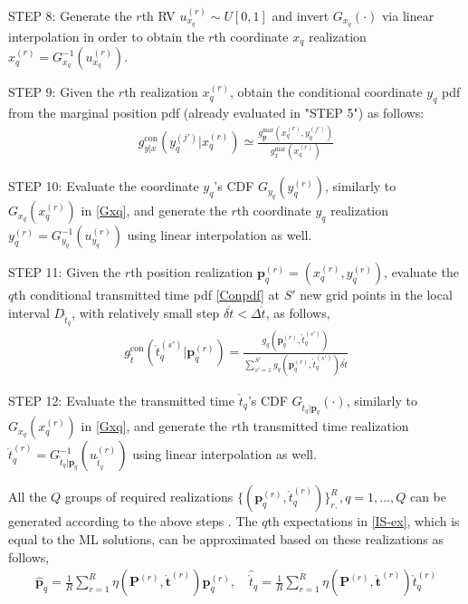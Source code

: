\documentclass[review]{elsarticle}
\begin{document}
STEP 8: Generate the $r$th RV $u_{x_q}^{(r)}\sim U[0,1]$ and invert $G_{x_q}(\cdot)$ via linear interpolation in order to obtain the $r$th coordinate $x_q$ realization $x_q^{(r)}=G_{x_q}^{-1}(u_{x_q}^{(r)})$.

STEP 9: Given the $r$th realization $x_q^{(r)}$, obtain the conditional coordinate $y_q$ pdf from the marginal position pdf (already evaluated in "STEP 5") as follows:
\begin{align}\label{step9}
    g_{y\vert x}^{\text{con}}(y_q^{(j')}\vert x_q^{(r)})\simeq \frac{g_{\boldsymbol{p}}^{\text{mar}}(x_q^{(r)},y_q^{(j')})}{g_{x}^{\text{mar}}(x_q^{(r)})}
\end{align}

STEP 10: Evaluate the coordinate $y_q$'s CDF $G_{y_q}(y_q^{(r)})$, similarly to $G_{x_q}(x_q^{(r)})$ in \eqref{Gxq}, and generate the $r$th coordinate $y_q$ realization $y_q^{(r)}=G_{y_q}^{-1}(u_{y_q}^{(r)})$ using linear interpolation as well.

STEP 11: Given the $r$th position realization $\boldsymbol{p}_q^{(r)}=(x_q^{(r)},y_q^{(r)})$, evaluate the $q$th conditional transmitted time pdf \eqref{Conpdf} at $S'$ new grid points in the local interval $D_{\mathring{t}_q}$, with relatively small step $\delta \mathring{t}<\Delta \mathring{t}$, as follows,
\begin{align}\label{step11}
    g_{\mathring{t}}^{\text{con}}(\mathring{t}_q^{(s')} \vert \boldsymbol{p}_q^{(r)})=\frac{g_q(\boldsymbol{p}_q^{(r)},\mathring{t}_q^{(s')})}{\sum_{s'=1}^{S'} g_q(\boldsymbol{p}_q^{(r)},\mathring{t}_q^{(s')})\delta\mathring{t}}
\end{align}

STEP 12: Evaluate the transmitted time $\mathring{t}_q$'s CDF $G_{\mathring{t}_q\vert \boldsymbol{p}_q}(\cdot)$, similarly to $G_{x_q}(x_q^{(r)})$ in \eqref{Gxq}, and generate the $r$th transmitted time realization $\mathring{t}_q^{(r)}=G^{-1}_{\mathring{t}_q\vert \boldsymbol{p}_q}(u_{\mathring{t}_q}^{(r)})$ using linear interpolation as well.

All the $Q$ groups of required realizations $\lbrace(\boldsymbol{p}_q^{(r)},\mathring{t}_q^{(r)})\rbrace_{r,}^{R},q=1,...,Q$ can be generated according to the above steps . The $q$th expectations in \eqref{IS-ex}, which is equal to the ML solutions, can be approximated based on these realizations as follows,
\begin{align}\label{sae}
    \hat{\boldsymbol{p}}_q=\frac{1}{R}\sum_{r=1}^R\eta(\boldsymbol{P}^{(r)},\mathring{\boldsymbol{t}}^{(r)}) \boldsymbol{p}_q^{(r)},\quad \hat{\mathring{t}}_q=\frac{1}{R}\sum_{r=1}^R\eta(\boldsymbol{P}^{(r)},\mathring{\boldsymbol{t}}^{(r)}) \mathring{t}_q^{(r)}
\end{align}
\end{document}
